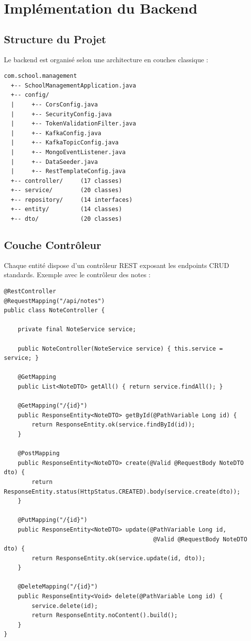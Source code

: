 \documentclass[12pt,a4paper,twoside]{report}
\begin{document}
\chapter{Implémentation du Backend}

\section{Structure du Projet}

Le backend est organisé selon une architecture en couches classique :

\begin{verbatim}
com.school.management
  +-- SchoolManagementApplication.java
  +-- config/
  |     +-- CorsConfig.java
  |     +-- SecurityConfig.java
  |     +-- TokenValidationFilter.java
  |     +-- KafkaConfig.java
  |     +-- KafkaTopicConfig.java
  |     +-- MongoEventListener.java
  |     +-- DataSeeder.java
  |     +-- RestTemplateConfig.java
  +-- controller/     (17 classes)
  +-- service/        (20 classes)
  +-- repository/     (14 interfaces)
  +-- entity/         (14 classes)
  +-- dto/            (20 classes)
\end{verbatim}

\section{Couche Contrôleur}

Chaque entité dispose d'un contrôleur REST exposant les endpoints CRUD standards. Exemple avec le contrôleur des notes :

\begin{lstlisting}[style=javaStyle, caption=NoteController]
@RestController
@RequestMapping("/api/notes")
public class NoteController {
    
    private final NoteService service;
    
    public NoteController(NoteService service) { this.service = service; }

    @GetMapping
    public List<NoteDTO> getAll() { return service.findAll(); }

    @GetMapping("/{id}")
    public ResponseEntity<NoteDTO> getById(@PathVariable Long id) {
        return ResponseEntity.ok(service.findById(id));
    }

    @PostMapping
    public ResponseEntity<NoteDTO> create(@Valid @RequestBody NoteDTO dto) {
        return ResponseEntity.status(HttpStatus.CREATED).body(service.create(dto));
    }

    @PutMapping("/{id}")
    public ResponseEntity<NoteDTO> update(@PathVariable Long id, 
                                           @Valid @RequestBody NoteDTO dto) {
        return ResponseEntity.ok(service.update(id, dto));
    }

    @DeleteMapping("/{id}")
    public ResponseEntity<Void> delete(@PathVariable Long id) {
        service.delete(id);
        return ResponseEntity.noContent().build();
    }
}
\end{lstlisting}
\end{document}
